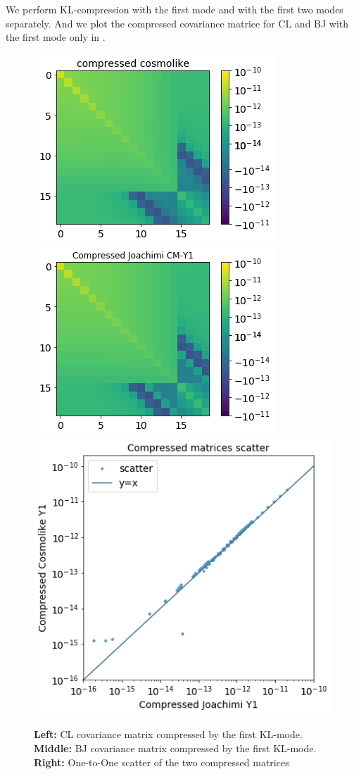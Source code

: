 \documentclass[twocolumn]{\docclass}
\begin{document}
	We perform KL-compression with the first mode and with the first two modes separately. And we plot the compressed covariance matrice for CL and BJ with the first mode only in .
	
	\begin{figure}
		\includegraphics[width=0.68\columnwidth]{kl_comp_cl.png}
		\includegraphics[width=0.68\columnwidth]{kl_comp_bj.png}
		\includegraphics[width=0.54\columnwidth]{kl_scatter.png}
		\caption{\textbf{Left:} CL covariance matrix compressed by the first KL-mode. \textbf{Middle:} BJ covariance matrix compressed by the first KL-mode. \textbf{Right:}  One-to-One scatter of the two compressed matrices \label{fig:comp-cov}}
	\end{figure}
	
\end{document}
